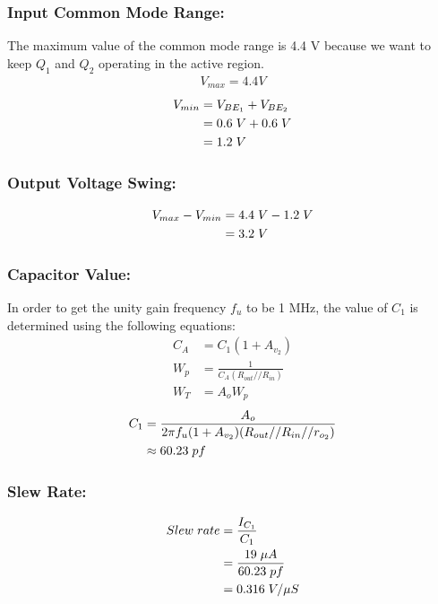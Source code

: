 \documentclass{article}
\begin{document}
	\subsubsection*{Input Common Mode Range:}
	The maximum value of the common mode range is 4.4 V because we want to keep $Q_1$ and $Q_2$ operating in the active region.
	\begin{align*}
		V_{max} = 4.4 V
	\end{align*}
	\begin{align*}
		V_{min} &= V_{BE_1} + V_{BE_2}\\
		&= 0.6 \hspace{1mm} V + 0.6 \hspace{1mm} V\\
		&= 1.2 \hspace{1mm} V
	\end{align*}
	\subsubsection*{Output Voltage Swing:}
	\begin{align*}
		V_{max} - V_{min} &= 4.4 \hspace{1mm} V - 1.2 \hspace{1mm} V\\
		&= 3.2 \hspace{1mm} V
	\end{align*}
	\subsubsection*{Capacitor Value:}
	In order to get the unity gain frequency $f_u$ to be 1 MHz, the value of $C_1$ is determined using the following equations:
	\begin{align*}
		C_A &= C_1 (1 + A_{v_2})\\
		W_p &= \frac{1}{C_A (R_{out} // R_{in})}\\
		W_T &= A_o W_p
	\end{align*}
	\begin{align*}
		C_1 &= \frac{A_o}{2\pi f_u (1 + A_{v_2}) (R_{out} // R_{in} // r_{o_2})}\\
		&\approx 60.23 \hspace{1mm} pf
	\end{align*}
	\subsubsection*{Slew Rate:}
	\begin{align*}
		Slew \hspace{1mm} rate &= \frac{I_{C_1}}{C_1}\\
		&= \frac{19 \hspace{1mm} \mu A}{60.23 \hspace{1mm} pf}\\
		&= 0.316 \hspace{1mm} V/\mu S
	\end{align*}
	
\end{document}
